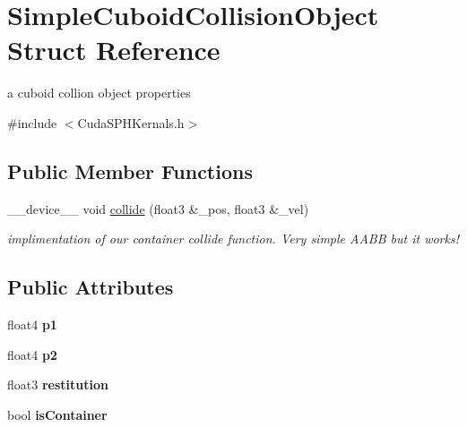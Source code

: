 \hypertarget{struct_simple_cuboid_collision_object}{\section{Simple\-Cuboid\-Collision\-Object Struct Reference}
\label{struct_simple_cuboid_collision_object}
}


a cuboid collion object properties  




{\ttfamily \#include $<$Cuda\-S\-P\-H\-Kernals.\-h$>$}

\subsection*{Public Member Functions}
\begin{DoxyCompactItemize}
\item 
\-\_\-\-\_\-device\-\_\-\-\_\- void \hyperlink{struct_simple_cuboid_collision_object_a82b63456b55c9f85d9437b996311a61f}{collide} (float3 \&\-\_\-pos, float3 \&\-\_\-vel)
\begin{DoxyCompactList}\small\item\em implimentation of our container collide function. Very simple A\-A\-B\-B but it works! \end{DoxyCompactList}\end{DoxyCompactItemize}
\subsection*{Public Attributes}
\begin{DoxyCompactItemize}
\item 
\hypertarget{struct_simple_cuboid_collision_object_acf541f736ac8574e3b969bbe89156a8b}{float4 {\bfseries p1}}\label{struct_simple_cuboid_collision_object_acf541f736ac8574e3b969bbe89156a8b}

\item 
\hypertarget{struct_simple_cuboid_collision_object_acf465694c70442acca7c6ad1377dd8b5}{float4 {\bfseries p2}}\label{struct_simple_cuboid_collision_object_acf465694c70442acca7c6ad1377dd8b5}

\item 
\hypertarget{struct_simple_cuboid_collision_object_ab6982f50b626992d0fb56ae9c43e053a}{float3 {\bfseries restitution}}\label{struct_simple_cuboid_collision_object_ab6982f50b626992d0fb56ae9c43e053a}

\item 
\hypertarget{struct_simple_cuboid_collision_object_a2d55f0ec6e6d06b463020f917ac23ad4}{bool {\bfseries is\-Container}}\label{struct_simple_cuboid_collision_object_a2d55f0ec6e6d06b463020f917ac23ad4}

\end{DoxyCompactItemize}


